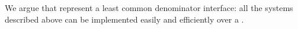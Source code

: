 We argue that \WORs{} represent a least common denominator interface: all the systems described above can be implemented easily and efficiently over a \WOR{}.%




